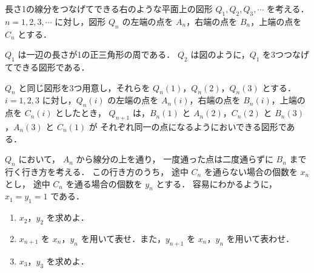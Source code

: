 \documentclass[../../main.tex]{subfiles}
\begin{document}
長さ1の線分をつなげてできる右のような平面上の図形 $Q_1,Q_2,Q_3,\cdots$ を考える．
$n=1,2,3,\cdots$ に対し，図形 $Q_n$ の左端の点を $A_n$，右端の点を $B_n$，上端の点を $C_n$ とする．

$Q_1$ は一辺の長さが1の正三角形の周である．
$Q_2$ は図のように，$Q_1$ を3つつなげてできる図形である．

$Q_n$ と同じ図形を3つ用意し，それらを $Q_n(1)$，$Q_n(2)$，$Q_n(3)$ とする．
$i=1,2,3$ に対し，$Q_n(i)$ の左端の点を $A_n(i)$，右端の点を $B_n(i)$，上端の点を $C_n(i)$ としたとき，
$Q_{n+1}$ は，$B_n(1)$ と $A_n(2)$，$C_n(2)$ と $B_n(3)$，$A_n(3)$ と $C_n(1)$ が
それぞれ同一の点になるようにおいできる図形である．

$Q_n$ において，
$A_n$ から線分の上を通り，
一度通った点は二度通らずに $B_n$ まで行く行き方を考える．
この行き方のうち，
途中 $C_n$ を通らない場合の個数を $x_n$ とし，
途中 $C_n$ を通る場合の個数を $y_n$ とする．
容易にわかるように，$x_1=y_1=1$ である．

\begin{figure}[htbp]
  \centering
\end{figure}

\begin{enumerate}
  \item $x_2$，$y_2$ を求めよ．
  \item $x_{n+1}$ を $x_n$，$y_n$ を用いて表せ．また，$y_{n+1}$ を $x_n$，$y_n$ を用いて表わせ．
  \item $x_3$，$y_3$ を求めよ．
\end{enumerate}
\end{document}
